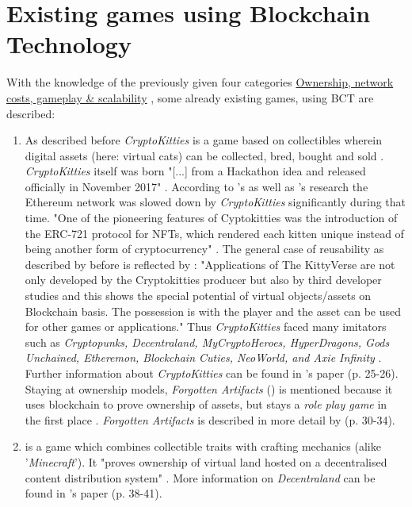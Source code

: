 \FloatBarrier

\section{Existing games using Blockchain Technology}
\label{sec:GamesOnBCT}

With the knowledge of the previously given four
categories \hyperref[sec:OwnershipGameplayNetwork]{Ownership,  network costs, gameplay \& scalability} , some already existing games, using \gls{BCT} are described:
\begin{enumerate}
	\item As described before \textit{CryptoKitties} is a game based on collectibles wherein digital assets (here: virtual cats) can be collected, bred, bought and sold \cite[2]{Serada.2020}.
	\textit{CryptoKitties} itself was born "[...] from a Hackathon idea and released officially in November 2017" \cite[25]{Laneve.2019}.
	According to \citet[15]{Laneve.2019}'s as well as \citet[18]{Serada.2020}'s research the Ethereum network was slowed down by \textit{CryptoKitties} significantly during that time. 
	"One of the pioneering features of Cyptokitties was the introduction of the ERC-721 protocol for \gls{NFTs},
	which rendered each kitten unique instead of being another form of cryptocurrency" \cite[25]{Laneve.2019}.
	The general case of reusability as described by \cite{Min.2019b} before is reflected by \citet[16]{Pfeiffer.2020}:
	"Applications of The KittyVerse are not only developed by the Cryptokitties producer but also by third developer studies and this shows the special potential of virtual objects/assets on Blockchain basis.
	The possession is with the player and the asset can be used for other games or applications."
	Thus \textit{CryptoKitties} faced many imitators such as \textit{Cryptopunks, Decentraland, MyCryptoHeroes, HyperDragons, Gods Unchained, Etheremon, Blockchain Cuties, NeoWorld, and Axie Infinity} \cite[3]{Serada.2020}.
	Further information about \textit{CryptoKitties} can be found in \citet{Laneve.2019}'s paper (p. 25-26).
	Staying at ownership models, \textit{Forgotten Artifacts} (\citet{lostrelics.io.2021}) is mentioned because it uses blockchain to prove ownership of assets,
	but stays a \textit{role play game} in the first place \cite[29]{Laneve.2019}.
	\textit{Forgotten Artifacts} is described in more detail by \citet{Laneve.2019} (p. 30-34).

	\item \citet{decentraland.org.2021} is a game which combines collectible traits
	with crafting mechanics (alike '\textit{Minecraft}').
	It "proves ownership of virtual land hosted on a decentralised content distribution system" \cite[29]{Laneve.2019}.
	More information on \textit{Decentraland} can be found in \citet{Laneve.2019}'s paper (p. 38-41).
	

\end{enumerate}
